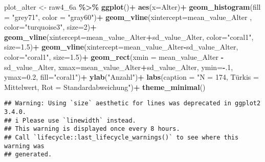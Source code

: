 \documentclass[
]{article}
\newenvironment{Shaded}{\begin{snugshade}}{\end{snugshade}}
\newcommand{\AttributeTok}[1]{\textcolor[rgb]{0.13,0.29,0.53}{#1}}
\newcommand{\DecValTok}[1]{\textcolor[rgb]{0.00,0.00,0.81}{#1}}
\newcommand{\FloatTok}[1]{\textcolor[rgb]{0.00,0.00,0.81}{#1}}
\newcommand{\FunctionTok}[1]{\textcolor[rgb]{0.13,0.29,0.53}{\textbf{#1}}}
\newcommand{\NormalTok}[1]{#1}
\newcommand{\OtherTok}[1]{\textcolor[rgb]{0.56,0.35,0.01}{#1}}
\newcommand{\SpecialCharTok}[1]{\textcolor[rgb]{0.81,0.36,0.00}{\textbf{#1}}}
\newcommand{\StringTok}[1]{\textcolor[rgb]{0.31,0.60,0.02}{#1}}
\begin{document}
\begin{Shaded}
\begin{Highlighting}[]
\NormalTok{plot\_alter }\OtherTok{\textless{}{-}}\NormalTok{ raw4\_6a }\SpecialCharTok{\%\textgreater{}\%} 
  \FunctionTok{ggplot}\NormalTok{()}\SpecialCharTok{+}
  \FunctionTok{aes}\NormalTok{(}\AttributeTok{x=}\NormalTok{Alter)}\SpecialCharTok{+}
  \FunctionTok{geom\_histogram}\NormalTok{(}\AttributeTok{fill =} \StringTok{"grey71"}\NormalTok{,}
                 \AttributeTok{color =} \StringTok{"gray60"}\NormalTok{)}\SpecialCharTok{+}
  \FunctionTok{geom\_vline}\NormalTok{(}\AttributeTok{xintercept=}\NormalTok{mean\_value\_Alter , }\AttributeTok{color=}\StringTok{"turquoise3"}\NormalTok{, }\AttributeTok{size=}\DecValTok{2}\NormalTok{)}\SpecialCharTok{+}
  \FunctionTok{geom\_vline}\NormalTok{(}\AttributeTok{xintercept=}\NormalTok{mean\_value\_Alter}\SpecialCharTok{+}\NormalTok{sd\_value\_Alter, }\AttributeTok{color=}\StringTok{"coral1"}\NormalTok{, }\AttributeTok{size=}\FloatTok{1.5}\NormalTok{)}\SpecialCharTok{+}
  \FunctionTok{geom\_vline}\NormalTok{(}\AttributeTok{xintercept=}\NormalTok{mean\_value\_Alter}\SpecialCharTok{{-}}\NormalTok{sd\_value\_Alter, }\AttributeTok{color=}\StringTok{"coral1"}\NormalTok{, }\AttributeTok{size=}\FloatTok{1.5}\NormalTok{)}\SpecialCharTok{+}
  \FunctionTok{geom\_rect}\NormalTok{(}\AttributeTok{xmin =}\NormalTok{ mean\_value\_Alter }\SpecialCharTok{{-}}\NormalTok{ sd\_value\_Alter,}
            \AttributeTok{xmax=}\NormalTok{mean\_value\_Alter}\SpecialCharTok{+}\NormalTok{sd\_value\_Alter,}
            \AttributeTok{ymin=}\SpecialCharTok{{-}}\NormalTok{.}\DecValTok{1}\NormalTok{, }\AttributeTok{ymax=}\FloatTok{0.2}\NormalTok{, }\AttributeTok{fill=}\StringTok{"coral1"}\NormalTok{)}\SpecialCharTok{+}
  \FunctionTok{ylab}\NormalTok{(}\StringTok{"Anzahl"}\NormalTok{)}\SpecialCharTok{+}
  \FunctionTok{labs}\NormalTok{(}\AttributeTok{caption =} \StringTok{"N = 174,}
\StringTok{                  Türkis = Mittelwert, Rot = Standardabweichung"}\NormalTok{)}\SpecialCharTok{+}
  \FunctionTok{theme\_minimal}\NormalTok{()}
\end{Highlighting}
\end{Shaded}

\begin{verbatim}
## Warning: Using `size` aesthetic for lines was deprecated in ggplot2 3.4.0.
## i Please use `linewidth` instead.
## This warning is displayed once every 8 hours.
## Call `lifecycle::last_lifecycle_warnings()` to see where this warning was
## generated.
\end{verbatim}
\end{document}
